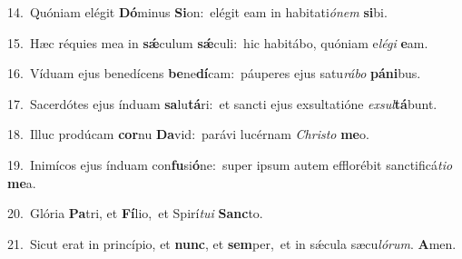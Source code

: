 {\numbfont\textcolor{\numbcolor}{14.}}~Quóniam elégit \textbf{Dó}\-minus \textbf{Si}\-on:~\star elégit eam in habitati\-\textit{ó}\-\textit{nem} \textbf{si}\-bi.\par
{\numbfont\textcolor{\numbcolor}{15.}}~Hæc réquies mea in \textbf{sǽ}\-culum \textbf{sǽ}\-culi:~\star hic habitábo, quóniam e\-\textit{lé}\-\textit{gi} \textbf{e}\-am.\par
{\numbfont\textcolor{\numbcolor}{16.}}~Víduam ejus benedícens \textbf{be}\-ne\-\textbf{dí}\-cam:~\star páuperes ejus satu\-\textit{rá}\-\textit{bo} \textbf{pá}\-\textbf{ni}bus.\par
{\numbfont\textcolor{\numbcolor}{17.}}~Sacerdótes ejus índuam \textbf{sa}\-lu\-\textbf{tá}\-ri:~\star et sancti ejus exsultatióne \textit{ex}\-\textit{sul}\textbf{tá}bunt.\par
{\numbfont\textcolor{\numbcolor}{18.}}~Illuc prodúcam \textbf{cor}\-nu \textbf{Da}\-vid:~\star parávi lucérnam \textit{Chris}\-\textit{to} \textbf{me}\-o.\par
{\numbfont\textcolor{\numbcolor}{19.}}~Inimícos ejus índuam con\-\textbf{fu}\-si\-\textbf{ó}\-ne:~\star super ipsum autem efflorébit sanctificá\-\textit{ti}\-\textit{o} \textbf{me}\-a.\par
{\numbfont\textcolor{\numbcolor}{20.}}~Glória \textbf{Pa}\-tri, et \textbf{Fí}\-lio,~\star et Spirí\-\textit{tu}\-\textit{i} \textbf{Sanc}\-to.\par
{\numbfont\textcolor{\numbcolor}{21.}}~Sicut erat in princípio, et \textbf{nunc}\-, et \textbf{sem}\-per,~\star et in sǽcula sæcu\-\textit{ló}\-\textit{rum}. \textbf{A}\-men.\par
